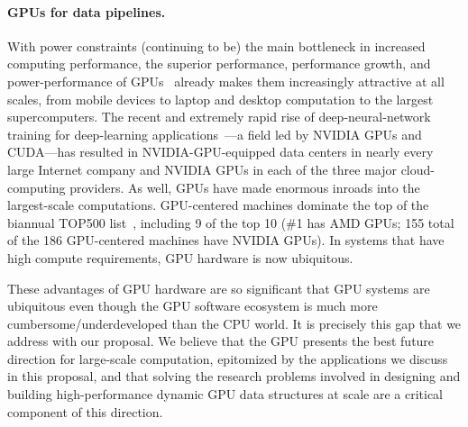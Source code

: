 \paragraph{GPUs for data pipelines.} With power constraints (continuing to be) the main bottleneck in increased
computing performance, the superior performance, performance growth, and
power-performance of GPUs~\cite{Dally:2010:GCT,Dally:2021:EOT} already makes
them increasingly attractive at all scales, from mobile devices to laptop and
desktop computation to the largest supercomputers. The recent and extremely
rapid rise of deep-neural-network training  for deep-learning
applications~\cite{Amodei:2015:DS2,Chetlur:2014:CEP,Coates:2013:DLW,Hannun:2014:DSU}---a
field led by NVIDIA GPUs and CUDA---has resulted in NVIDIA-GPU-equipped data
centers in nearly every large Internet company and NVIDIA GPUs in each of the
three major cloud-computing providers. As well, GPUs have made enormous inroads
into the largest-scale computations. GPU-centered machines dominate the top of
the biannual TOP500 list~\cite{top500:jun2024}, including 9 of the top 10 (\#1
has AMD GPUs; 155 total of the 186 GPU-centered machines have NVIDIA GPUs). In
systems that have high compute requirements, GPU hardware is now ubiquitous.

These advantages of GPU hardware are so significant that GPU systems are
ubiquitous even though the GPU software ecosystem is much more
cumbersome/underdeveloped than the CPU world. It is precisely this gap that we
address with our proposal. We believe that the GPU presents the best future
direction for large-scale computation, epitomized by the applications we
discuss in this proposal, and that solving the research problems involved in
designing and building high-performance dynamic GPU data structures at scale
are a critical component of this direction.


